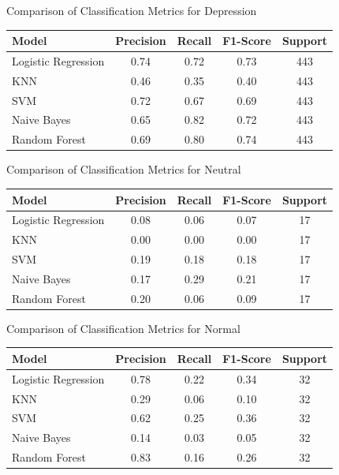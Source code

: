 \begin{center}
\vspace{0.25in}

\centering
Comparison of Classification Metrics for Depression
\begin{tabular}{|l|c|c|c|c|}
\hline
\textbf{Model} & \textbf{Precision} & \textbf{Recall} & \textbf{F1-Score} & \textbf{Support} \\ \hline
Logistic Regression & 0.74 & 0.72 & 0.73 & 443 \\ \hline
KNN                & 0.46 & 0.35 & 0.40 & 443 \\ \hline
SVM                & 0.72 & 0.67 & 0.69 & 443 \\ \hline
Naive Bayes        & 0.65 & 0.82 & 0.72 & 443 \\ \hline
Random Forest      & 0.69 & 0.80 & 0.74 & 443 \\ \hline
\end{tabular}

\vspace{0.25in}

\centering
Comparison of Classification Metrics for Neutral
\begin{tabular}{|l|c|c|c|c|}
\hline
\textbf{Model} & \textbf{Precision} & \textbf{Recall} & \textbf{F1-Score} & \textbf{Support} \\ \hline
Logistic Regression & 0.08 & 0.06 & 0.07 & 17 \\ \hline
KNN                & 0.00 & 0.00 & 0.00 & 17 \\ \hline
SVM                & 0.19 & 0.18 & 0.18 & 17 \\ \hline
Naive Bayes        & 0.17 & 0.29 & 0.21 & 17 \\ \hline
Random Forest      & 0.20 & 0.06 & 0.09 & 17 \\ \hline
\end{tabular}


\vspace{0.25in}

Comparison of Classification Metrics for Normal
\begin{tabular}{|l|c|c|c|c|}
\hline
\textbf{Model} & \textbf{Precision} & \textbf{Recall} & \textbf{F1-Score} & \textbf{Support} \\ \hline
Logistic Regression & 0.78 & 0.22 & 0.34 & 32 \\ \hline
KNN                & 0.29 & 0.06 & 0.10 & 32 \\ \hline
SVM                & 0.62 & 0.25 & 0.36 & 32 \\ \hline
Naive Bayes        & 0.14 & 0.03 & 0.05 & 32 \\ \hline
Random Forest      & 0.83 & 0.16 & 0.26 & 32 \\ \hline
\end{tabular}


\end{center}
